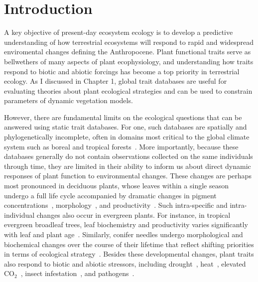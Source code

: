 \section{Introduction}

A key objective of present-day ecosystem ecology is to develop a predictive understanding of how terrestrial ecosystems will respond to rapid and widespread enviromental changes defining the Anthropocene. 
Plant functional traits serve as bellwethers of many aspects of plant ecophysiology, and understanding how traits respond to biotic and abiotic forcings has become a top priority in terrestrial ecology.
As I discussed in Chapter 1, global trait databases are useful for evaluating theories about plant ecological strategies and can be used to constrain parameters of dynamic vegetation models.

However, there are fundamental limits on the ecological questions that can be answered using static trait databases.
For one, such databases are spatially and phylogenetically incomplete, often in domains most critical to the global climate system such as boreal and tropical forests~\cite{jetz2016_diversity}.
More importantly, because these databases generally do not contain observations collected on the same individuals through time, they are limited in their ability to inform us about direct dynamic responses of plant function to environmental changes.
These changes are perhaps most pronounced in deciduous plants, whose leaves within a single season undergo a full life cycle accompanied by dramatic changes in pigment concentrations~\cite{yang_2016_seasonal}, morphology~\cite{poorter_2009_causes}, and productivity~\cite{parent_2010_modelling}.
Such intra-specific and intra-individual changes also occur in evergreen plants.
For instance, in tropical evergreen broadleaf trees, leaf biochemistry and productivity varies significantly with leaf and plant age~\cite{kitajima_1997_decline,Kitajima_2013_leaf,chavana_bryant_2016_leaf,wu_leaf_2016}.
Similarly, conifer needles undergo morphological and biochemical changes over the course of their lifetime that reflect shifting priorities in terms of ecological strategy~\cite{kuusk_2017_major}.
Besides these developmental changes, plant traits also respond to biotic and abiotic stressors, including
drought~\cite{sun_2018_reflectance,buchner_2017_drought,bayat_2016_remote},
heat~\cite{chapin_1996_physiological,serbin_2012_spectroscopic},
elevated CO$_2$~\cite{medlyn_using_2015,lindroth_2010_impacts},
insect infestation~\cite{divittorio_2009_spectral,marti_2012_metabolomics},
and pathogens~\cite{horst_2009_ustilago}.

